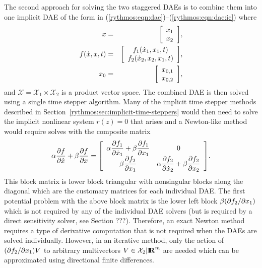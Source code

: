 \documentclass[pdf,ps2pdf,11pt]{SANDreport}
\begin{document}
The second approach for solving the two staggered DAEs is to combine them into
one implicit DAE of the form in
(\ref{rythmos:eqn:dae})--(\ref{rythmos:eqn:dae:ic}) where
%
\begin{eqnarray*}
x & = & {\bmat{c} x_1 \\ x_2 \emat}, \\
f(\dot{x},x,t) & = & {\bmat{c} f_1(\dot{x}_1,x_1,t) \\  f_2(\dot{x}_2,x_2,x_1,t) \emat}, \\
x_0 & = & {\bmat{c} x_{0,1} \\ x_{0,2} \emat},
\end{eqnarray*}
%
and $\mathcal{X}=\mathcal{X}_1\times\mathcal{X}_2$ is a product vector space.
The combined DAE is then solved using a single time stepper algorithm.  Many
of the implicit time stepper methods described in
Section~\ref{rythmos:sec:implicit-time-steppers} would then need to solve the
implicit nonlinear system $r(z)=0$ that arises and a Newton-like method would
require solves with the composite matrix
%
\begin{equation}
\alpha \Jac{f}{\dot{x}} + \beta \Jac{f}{x}
=
{\bmat{cc}
\alpha \Jac{f_1}{\dot{x}_1} + \beta \Jac{f_1}{x_1}
& 0 \\
\beta \Jac{f_2}{x_1}
& \alpha \Jac{f_2}{\dot{x}_2} + \beta \Jac{f_2}{x_2} \\
\emat}.
\end{equation}
%
This block matrix is lower block triangular with nonsingular blocks along the
diagonal which are the customary matrices for each individual DAE.  The first
potential problem with the above block matrix is the lower left block $\beta
(\jac{f_2}{x_1})$ which is not required by any of the individual DAE solvers
(but is required by a direct sensitivity solver, see Section ???).  Therefore,
an exact Newton method requires a type of derivative computation that is not
required when the DAEs are solved individually.  However, in an iterative
method, only the action of $(\jac{f_2}{x_1}) V$ to arbitrary multivectors
$V\in\mathcal{X}_2|\RE^m$ are needed which can be approximated using
directional finite differences.
\end{document}
